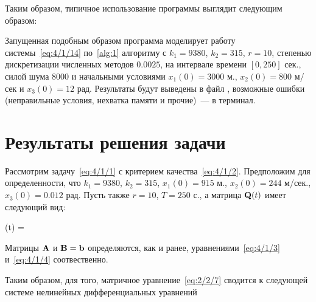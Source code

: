 Таким образом, типичное использование программы выглядит следующим образом:


Запущенная подобным образом программа моделирует работу системы~\vref{eq:4/1/14} по~\ref{alg:1} алгоритму с $k_1=9380$, $k_2=315$, $r=10$, степенью дискретизации численных методов $0.0025$, на интервале времени $[0, 250]$ сек., силой шума $8000$ и начальными условиями $x_1(0)=3000$ м., $x_2(0)=800$ м/сек и $x_3(0)=12$ рад. Результаты будут выведены в файл , возможные ошибки (неправильные условия, нехватка памяти и прочие)~--- в терминал.



\section{Результаты решения задачи}



Рассмотрим задачу~\vref{eq:4/1/1} с критерием качества~\vref{eq:4/1/2}. Предположим для определенности, что $k_1=9380$, $k_2=315$, $x_1(0)=915$ м., $x_2(0)=244$ м/сек., $x_3(0)=0.012$ рад. Пусть также $r=10$, $T=250$ с., а матрица $\mathbf{Q}(t)$ имеет следующий вид:

    (t) =   
\eeq

Матрицы $\mathbf{A}$ и $\mathbf{B} = \mathbf{b}$ определяются, как и ранее, уравнениями~\ref{eq:4/1/3} и~\vref{eq:4/1/4} соотвественно.

Таким образом, для того, матричное уравнение~\vref{eq:2/2/7} сводится к следующей системе нелинейных дифференциальных уравнений

